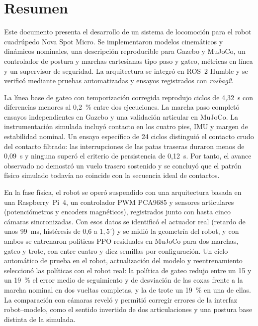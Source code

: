 \chapter*{Resumen}

Este documento presenta el desarrollo de un sistema de locomoción para el
robot cuadrúpedo Nova Spot Micro. Se implementaron modelos cinemáticos y
dinámicos nominales, una descripción reproducible para Gazebo y MuJoCo, un
controlador de postura y marchas cartesianas tipo paso y gateo, métricas en
línea y un supervisor de seguridad. La arquitectura se integró en ROS~2 Humble
y se verificó mediante pruebas automatizadas y ensayos registrados con
\textit{rosbag2}.

La línea base de gateo con temporización corregida reprodujo ciclos de
4,32~s con diferencias menores al 0,2~\% entre dos ejecuciones. La marcha paso
completó ensayos independientes en Gazebo y una validación articular en MuJoCo.
La instrumentación simulada incluyó contacto en los cuatro pies, IMU y margen
de estabilidad nominal. Un ensayo específico de 24 ciclos distinguió el
contacto crudo del contacto filtrado: las interrupciones de las patas traseras
duraron menos de 0,09~s y ninguna superó el criterio de persistencia de
0,12~s. Por tanto, el avance observado no demostró un vuelo trasero sostenido y
se concluyó que el patrón físico simulado todavía no coincide con la secuencia
ideal de contactos.

En la fase física, el robot se operó suspendido con una arquitectura basada en
una Raspberry~Pi~4, un controlador PWM PCA9685 y sensores articulares
(potenciómetros y encoders magnéticos), registrados junto con hasta cinco
cámaras sincronizadas.
Con esos datos se identificó el actuador real (retardo de unos 99~ms,
histéresis de 0,6 a $1{,}5^\circ$) y se midió la geometría del robot, y con
ambos se entrenaron políticas PPO residuales en MuJoCo para dos marchas, gateo y
trote, con entre cuatro y diez semillas por configuración. Un ciclo automático
de prueba en el robot, actualización del modelo y reentrenamiento seleccionó las
políticas con el robot real: la política de gateo redujo entre un 15 y un 19~\%
el error medio de seguimiento y de desviación de las coxas frente a la marcha
nominal en dos vueltas completas, y la de trote un 19~\% en una de ellas. La
comparación con cámaras reveló y permitió corregir errores de la interfaz
robot--modelo, como el sentido invertido de dos articulaciones y una postura
base distinta de la simulada.

